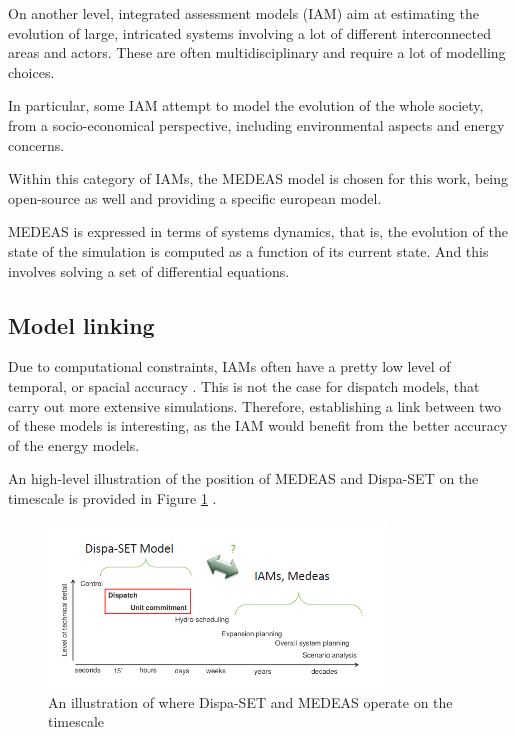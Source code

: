 On another level, integrated assessment models (IAM) aim at estimating the evolution of large, intricated systems involving a lot of different interconnected areas and actors. These are often multidisciplinary and require a lot of modelling choices.

In particular, some IAM attempt to model the evolution of the whole society, from a socio-economical perspective, including environmental aspects and energy concerns.

Within this category of IAMs, the MEDEAS model is chosen for this work, being open-source as well and providing a specific european model.

MEDEAS is expressed in terms of systems dynamics, that is, the evolution of the state of the simulation is computed as a function of its current state. And this involves solving a set of differential equations.

\subsection{Model linking}

Due to computational constraints, IAMs often have a pretty low level of temporal, or spacial accuracy \cite{linkings-stuff}. This is not the case for dispatch models, that carry out more extensive simulations. Therefore, establishing a link between two of these models is interesting, as the IAM would benefit from the better accuracy of the energy models. 

An high-level illustration of the position of MEDEAS and Dispa-SET on the timescale is provided in Figure \ref{fig:dispaset-medeas-timescale} \cite{dispaset}.

\begin{figure}[h]
    \centering
    \includegraphics[width=0.8\textwidth]{resources/images/dispaset-medeas-timescale.png}
    \caption{An illustration of where Dispa-SET and MEDEAS operate on the timescale}
    \label{fig:dispaset-medeas-timescale}
\end{figure}

